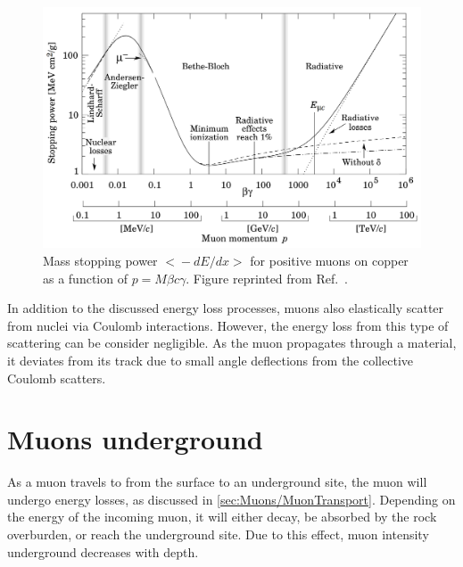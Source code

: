 \begin{figure}
    \centering
    \includegraphics[width=0.8\linewidth]{figures/Muons/MassMuonStoppingPowerOfMuonsOnCu.png}
    \caption[Mass stopping power $\big<-dE/dx\big>$ for positive muons on copper as a function of $p=M\beta c\gamma$.]{Mass stopping power $\big<-dE/dx\big>$ for positive muons on copper as a function of $p=M\beta c\gamma$. Figure reprinted from Ref.~\cite{GROOM2001183}.}
    \label{fig:Muons/StoppingPowerOffMuonsCu}
\end{figure}
In addition to the discussed energy loss processes, muons also elastically scatter from nuclei via Coulomb interactions. However, the energy loss from this type of scattering can be consider negligible. As the muon propagates through a material, it deviates from its track due to small angle deflections from the collective Coulomb scatters. 

\section{Muons underground}\label{sec:Muons/MuonsUnderground}
As a muon travels to from the surface to an underground site, the muon will undergo energy losses, as discussed in \autoref{sec:Muons/MuonTransport}. Depending on the energy of the incoming muon, it will either decay, be absorbed by the rock overburden, or reach the underground site. Due to this effect, muon intensity underground decreases with depth.

